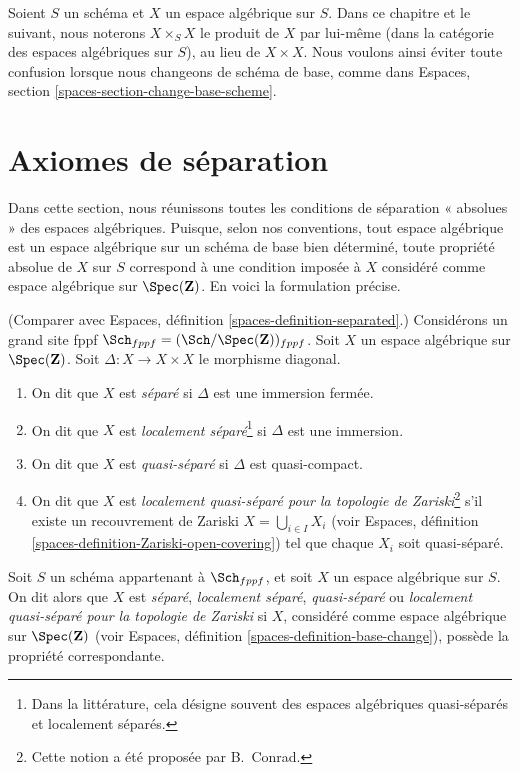 \medskip\noindent
Soient $S$ un schéma et $X$ un espace algébrique sur $S$.
Dans ce chapitre et le suivant, nous noterons $X \times_S X$
le produit de $X$ par lui-même (dans la catégorie des espaces
algébriques sur $S$), au lieu de $X \times X$. Nous voulons ainsi
éviter toute confusion lorsque nous changeons de schéma de base, comme dans
Espaces, section \ref{spaces-section-change-base-scheme}.


\section{Axiomes de séparation}
\label{section-separation}

\noindent
Dans cette section, nous réunissons toutes les conditions de séparation « absolues »
des espaces algébriques. Puisque, selon nos conventions, tout espace algébrique est un
espace algébrique sur un schéma de base bien déterminé, toute propriété absolue
de $X$ sur $S$ correspond à une condition imposée à $X$ considéré
comme espace algébrique sur $\Spec(\mathbf{Z})$. En voici la
formulation précise.

\begin{definition}
\label{definition-separated}
(Comparer avec Espaces, définition \ref{spaces-definition-separated}.)
Considérons un grand site fppf
$\Sch_{fppf} = (\Sch/\Spec(\mathbf{Z}))_{fppf}$.
Soit $X$ un espace algébrique sur
$\Spec(\mathbf{Z})$. Soit $\Delta : X \to X \times X$
le morphisme diagonal.
\begin{enumerate}
\item On dit que $X$ est {\it séparé} si $\Delta$ est une immersion fermée.
\item On dit que $X$ est {\it localement séparé}\footnote{Dans la
littérature, cela désigne souvent des espaces algébriques quasi-séparés et
localement séparés.} si $\Delta$ est une
immersion.
\item On dit que $X$ est {\it quasi-séparé} si $\Delta$ est quasi-compact.
\item On dit que $X$ est {\it localement quasi-séparé pour la topologie de Zariski}\footnote{
Cette notion a été proposée par B.\ Conrad.} s'il
existe un recouvrement de Zariski $X = \bigcup_{i \in I} X_i$ (voir Espaces,
définition \ref{spaces-definition-Zariski-open-covering}) tel que
chaque $X_i$ soit quasi-séparé.
\end{enumerate}
Soit $S$ un schéma appartenant à $\Sch_{fppf}$, et soit
$X$ un espace algébrique sur $S$. On dit alors que $X$ est {\it séparé},
{\it localement séparé}, {\it quasi-séparé} ou
{\it localement quasi-séparé pour la topologie de Zariski}
si $X$, considéré comme espace algébrique sur $\Spec(\mathbf{Z})$ (voir
Espaces, définition \ref{spaces-definition-base-change}),
possède la propriété correspondante.
\end{definition}

